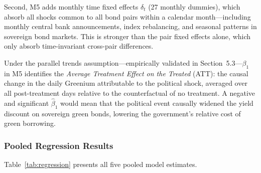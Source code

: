 \documentclass[12pt,a4paper]{article}
\begin{document}
Second, M5 adds monthly time fixed effects $\delta_t$ (27 monthly dummies), which absorb all shocks common to all bond pairs within a calendar month---including monthly central bank announcements, index rebalancing, and seasonal patterns in sovereign bond markets. This is stronger than the pair fixed effects alone, which only absorb time-invariant cross-pair differences.

Under the parallel trends assumption---empirically validated in Section~5.3---$\beta_1$ in M5 identifies the \textit{Average Treatment Effect on the Treated} (ATT): the causal change in the daily Greenium attributable to the political shock, averaged over all post-treatment days relative to the counterfactual of no treatment. A negative and significant $\hat{\beta}_1$ would mean that the political event causally widened the yield discount on sovereign green bonds, lowering the government's relative cost of green borrowing.

\subsubsection{Pooled Regression Results}

Table~\ref{tab:regression} presents all five pooled model estimates.
\end{document}

